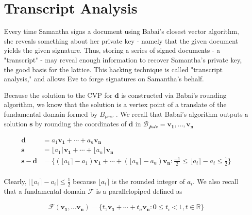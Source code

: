 \documentclass[11pt,reqno]{amsart}
\theoremstyle{definition}
\newcommand{\R}{\mathbb{R}}
\begin{document}
\section{Transcript Analysis}

Every time Samantha signs a document using Babai's closest vector algorithm, she reveals something about her private key - namely that the given document yields the given signature. Thus, storing a series of signed documents - a "transcript" - may reveal enough information to recover Samantha's private key, the good basis for the lattice. This hacking technique is called "transcript analysis," and allows Eve to forge signatures on Samantha's behalf. 

Because the solution to the CVP for $\mathbf{d}$ is constructed via Babai's rounding algorithm, we know that the solution is a vertex point of a translate of the fundamental domain formed by $B_{priv}$ \cite[Chapter 7.6]{textbook}. We recall that Babai's algorithm outputs a solution $\mathbf{s}$ by rounding the coordinates of $\mathbf{d}$ in $\mathcal{B_\text{priv}} = \mathbf{v_1, ... , v_n}$

\vspace{-0.4cm}
\begin{align*}
    \mathbf{d} &= a_1\mathbf{v_1} + \cdots + a_n\mathbf{v_n}\\
    \mathbf{s} &= \lfloor a_1 \rceil \mathbf{v_1} + \cdots + \lfloor a_n \rceil \mathbf{v_n} \\
    \mathbf{s-d} &= \{(\lfloor a_1 \rceil - a_1) \mathbf{v_1} + \cdots + (\lfloor a_n \rceil - a_n)\mathbf{v_n} : \frac{-1}{2} \leq \lfloor a_i \rceil - a_i \leq \frac{1}{2} \}\\
\end{align*}


\vspace{-0.7cm}
Clearly, $|\lfloor a_i \rceil - a_i| \leq \frac{1}{2}$ because $\lfloor a_i \rceil$ is the rounded integer of $a_i$. We also recall that a fundamental domain $\mathcal{F}$ is a parallelopiped defined as 

\vspace{-0.5cm}
\begin{align*}
    \mathcal{F}(\mathbf{v_1,...v_n}) = \{t_1\mathbf{v_1} + \cdots + t_n\mathbf{v_n} : 0 \leq t_i < 1, t \in \R \}
\end{align*}
\end{document}
